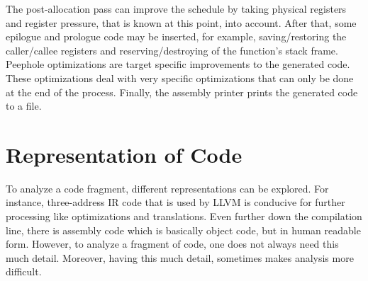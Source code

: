The post-allocation pass can improve the schedule by taking physical registers and register pressure, that is known at this point, into account. After that, some epilogue and prologue code may be inserted, for example, saving/restoring the caller/callee registers and reserving/destroying of the function's stack frame. Peephole optimizations are target specific improvements to the generated code. These optimizations deal with very specific optimizations that can only be done at the end of the process. Finally, the assembly printer prints the generated code to a file.








\section{Representation of Code}
To analyze a code fragment, different representations can be explored. For instance, three-address IR code that is used by LLVM is conducive for further processing like optimizations and translations. Even further down the compilation line, there is assembly code which is basically object code, but in human readable form. However, to analyze a fragment of code, one does not always need this much detail. Moreover, having this much detail, sometimes makes analysis more difficult. 


